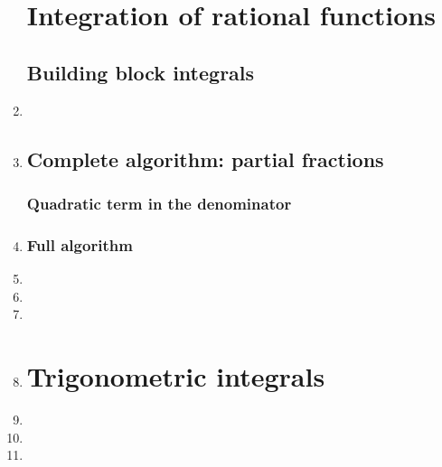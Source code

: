 \documentclass{article}
\begin{document}
\begin{enumerate}
\section{Integration of rational functions}
\subsection{Building block integrals}


\item

\item

\subsection{Complete algorithm: partial fractions}
\subsubsection{Quadratic term in the denominator}
\item

\subsubsection{Full algorithm}
\item

\item

\item


\item

\section{Trigonometric integrals}
\item

\item

\item



\end{enumerate}
\end{document}
